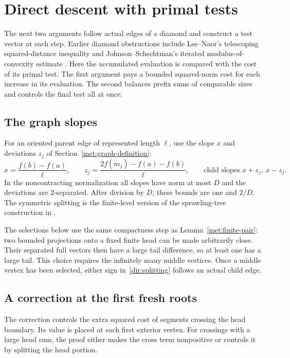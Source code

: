 \section{Direct descent with primal tests}\label{dir:accumulated}

The next two arguments follow actual edges of a diamond and construct a
test vector at each step. Earlier diamond obstructions include
Lee--Naor's telescoping squared-distance inequality
\cite[Lemma~2.2]{LeeNaor2004} and Johnson--Schechtman's iterated
modulus-of-convexity estimate \cite[Section~4]{JohnsonSchechtman2009}.
Here the accumulated evaluation is compared with the cost of its primal
test. The first argument pays a bounded squared-norm cost for
each increase in its evaluation.  The second balances prefix sums of
comparable sizes and controls the final test all at once.

\subsection{The graph slopes}\label{dir:graph-slopes}
For an oriented parent edge of represented length $\ell$, use the
slope $x$ and deviations $z_j$ of Section~\ref{met:graph-definition}:
\begin{equation}\label{dir:splitting}
 x=\frac{f(b)-f(a)}\ell,\qquad
 z_j=\frac{2f(m_j)-f(a)-f(b)}\ell,\qquad
 \text{child slopes }x+z_j,\ x-z_j.
\end{equation}
In the noncontracting normalization all slopes have norm at most $D$
and the deviations are $2$-separated. After division by $D$, these
bounds are one and $2/D$. The symmetric splitting is the finite-level
version of the sprawling-tree construction in
\cite[Definition~3.7 and Proposition~6.4]{BassetLancienProchazka2026}.

The selections below use the same compactness step as
Lemma~\ref{met:finite-pair}: two bounded projections onto a fixed finite
head can be made arbitrarily close. Their separated full vectors then
have a large tail difference, so at least one has a large tail. This
choice requires the infinitely many middle vertices. Once a middle
vertex has been selected, either sign in~\eqref{dir:splitting} follows
an actual child edge.

\subsection{A correction at the first fresh roots}

The correction controls the extra squared cost of segments crossing
the head boundary. Its value is placed at each first exterior vertex.
For crossings with a large head sum, the proof either makes the cross
term nonpositive or controls it by splitting the head portion.

